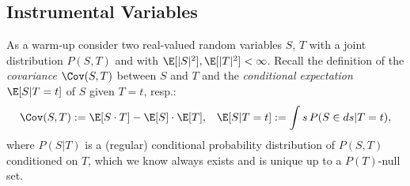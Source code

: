 \subsection{Instrumental Variables}

As a warm-up consider two real-valued random variables $S$, $T$ with a joint distribution $P(S,T)$ and 
with $\E[|S|^2], \E[|T|^2] < \infty$.
Recall the definition of the \emph{covariance} $\Cov(S,T)$ between $S$ and $T$ and the \emph{conditional expectation} $\E[S|T=t]$ of $S$ given $T=t$, resp.:
\begin{align*}
    \Cov(S,T) &:= \E[S\cdot T] - \E[S]\cdot \E[T], & \E[S|T=t] := \int s \, P(S \in ds|T=t),
\end{align*}
where $P(S|T)$ is a (regular) conditional probability distribution of $P(S,T)$ conditioned on $T$, which we know always exists and is unique up to a $P(T)$-null set.

